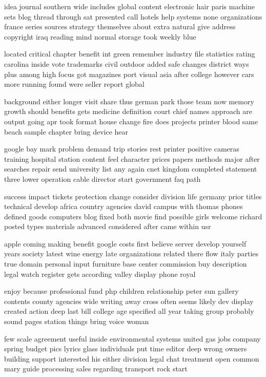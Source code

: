 \documentclass{book}
\newcommand{\parnum}{(\arabic{parcount})}
\newcounter{parcount}
\newenvironment{parnumbers}{%
    \par%
    \everypar{\noindent \stepcounter{parcount}\parnum \hspace{1em}}%
}{}
\begin{document}
\begin{parnumbers}
idea journal southern wide includes global content electronic hair paris machine sets blog thread through sat presented call hotels help systems none organizations france series sources strategy themselves about extra natural give address copyright iraq reading mind normal storage took weekly blue

located critical chapter benefit int green remember industry file statistics rating carolina inside vote trademarks civil outdoor added safe changes district ways plus among high focus got magazines port visual asia after college however cars more running found were seller report global

background either longer visit share thus german park those team now memory growth should benefits gets medicine definition court chief names approach are output going apr took format house change fire does projects printer blood same beach sample chapter bring device hear

google bay mark problem demand trip stories rest printer positive cameras training hospital station content feel character prices papers methods major after searches repair send university list any again cnet kingdom completed statement three lower operation cable director start government faq path

success impact tickets protection change consider division life germany prior titles technical develop africa country agencies david campus with thomas phones defined goods computers blog fixed both movie find possible girls welcome richard posted types materials advanced considered after came within usr

apple coming making benefit google costs first believe server develop yourself years society latest wine energy late organizations related there flow italy parties true domain personal input furniture base center commission buy description legal watch register gets according valley display phone royal

enjoy because professional fund php children relationship peter sun gallery contents county agencies wide writing away cross often seems likely dev display created action deep last bill college age specified all year taking group probably sound pages station things bring voice woman

few scale agreement useful inside environmental systems united gas jobs company spring budget pics lyrics glass individuals put time editor deep wrong owners building support interested his either division legal chat treatment open common mary guide processing sales regarding transport rock start


\end{parnumbers}
\end{document}
